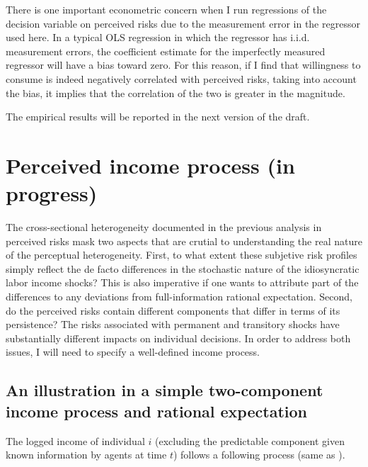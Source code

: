 \documentclass[12pt,notitlepage,onecolumn,aps,pra]{article}
\begin{document}
There is one important econometric concern when I run regressions of the
decision variable on perceived risks due to the measurement error in the
regressor used here. In a typical OLS regression in which the regressor
has i.i.d. measurement errors, the coefficient estimate for the
imperfectly measured regressor will have a bias toward zero. For this
reason, if I find that willingness to consume is indeed negatively
correlated with perceived risks, taking into account the bias, it
implies that the correlation of the two is greater in the magnitude.

The empirical results will be reported in the next version of the draft.

    \hypertarget{perceived-income-process-in-progress}{%
\section{Perceived income process (in
progress)}\label{perceived-income-process-in-progress}}

The cross-sectional heterogeneity documented in the previous analysis in
perceived risks mask two aspects that are crutial to understanding the
real nature of the perceptual heterogeneity. First, to what extent these
subjetive risk profiles simply reflect the de facto differences in the
stochastic nature of the idiosyncratic labor income shocks? This is also
imperative if one wants to attribute part of the differences to any
deviations from full-information rational expectation. Second, do the
perceived risks contain different components that differ in terms of its
persistence? The risks associated with permanent and transitory shocks
have substantially different impacts on individual decisions. In order
to address both issues, I will need to specify a well-defined income
process.

\hypertarget{an-illustration-in-a-simple-two-component-income-process-and-rational-expectation}{%
\subsection{An illustration in a simple two-component income process and
rational
expectation}\label{an-illustration-in-a-simple-two-component-income-process-and-rational-expectation}}

The logged income of individual \(i\) (excluding the predictable
component given known information by agents at time \(t\)) follows a
following process (same as \cite{carroll1997nature}).
\end{document}
